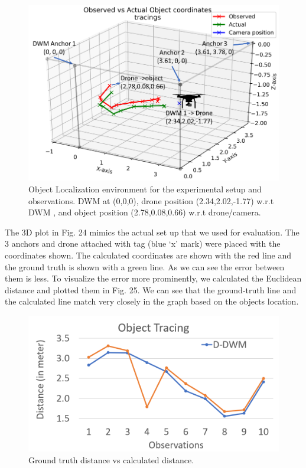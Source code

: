 \documentclass{IEEEtran}
\begin{document}
\begin{figure}[htb]
\centering
\includegraphics[width=1\linewidth]{fig/room2.png}
\caption{Object Localization environment for the experimental setup and observations. DWM at (0,0,0), drone position (2.34,2.02,-1.77) w.r.t DWM , and object position (2.78,0.08,0.66) w.r.t drone/camera.} \label{fig.structure}
\end{figure}

The 3D plot in Fig. 24 mimics the actual set up that we used for evaluation. The 3 anchors and drone attached with tag (blue ‘x’ mark) were placed with the coordinates shown. The calculated coordinates are shown with the red line and the ground truth is shown with a green line. As we can see the error between them is less. To visualize the error more prominently, we calculated the Euclidean distance and plotted them in Fig. 25. We can see that the ground-truth line and the calculated line match very closely in the graph based on the objects location.

\begin{figure}[htb]
\centering
\includegraphics[width=1\linewidth]{fig/error_graph_obj_local.png}
\caption{Ground truth distance vs calculated distance.} \label{fig.structure}
\end{figure}
\end{document}
